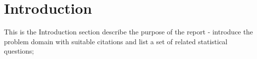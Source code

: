 \section{Introduction}\label{Section label}
This is the Introduction section
describe the purpose of the report - introduce the problem domain with suitable citations and list a set of related statistical questions; 


